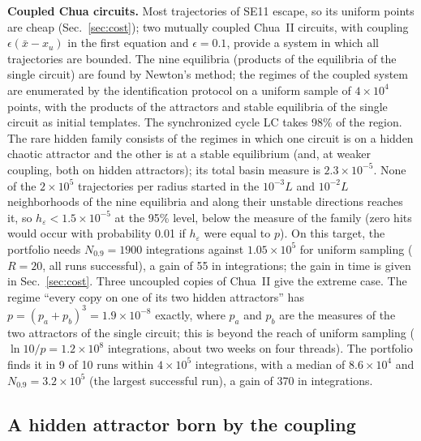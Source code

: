 \textbf{Coupled Chua circuits.} Most trajectories of SE11 escape, so its uniform points are cheap (Sec.~\ref{sec:cost}); two mutually coupled Chua~II circuits, with coupling $\epsilon(\bar x-x_u)$ in the first equation and $\epsilon=0.1$, provide a system in which all trajectories are bounded. The nine equilibria (products of the equilibria of the single circuit) are found by Newton's method; the regimes of the coupled system are enumerated by the identification protocol on a uniform sample of $4\times10^4$ points, with the products of the attractors and stable equilibria of the single circuit as initial templates. The synchronized cycle LC takes 98\% of the region. The rare hidden family consists of the regimes in which one circuit is on a hidden chaotic attractor and the other is at a stable equilibrium (and, at weaker coupling, both on hidden attractors); its total basin measure is $2.3\times10^{-5}$. None of the $2\times10^5$ trajectories per radius started in the $10^{-3}L$ and $10^{-2}L$ neighborhoods of the nine equilibria and along their unstable directions reaches it, so $h_\varepsilon<1.5\times10^{-5}$ at the 95\% level, below the measure of the family (zero hits would occur with probability 0.01 if $h_\varepsilon$ were equal to $p$). On this target, the portfolio needs $N_{0.9}=1900$ integrations against $1.05\times10^5$ for uniform sampling ($R=20$, all runs successful), a gain of 55 in integrations; the gain in time is given in Sec.~\ref{sec:cost}. Three uncoupled copies of Chua~II give the extreme case. The regime ``every copy on one of its two hidden attractors'' has $p=(p_a+p_b)^3=1.9\times10^{-8}$ exactly, where $p_a$ and $p_b$ are the measures of the two attractors of the single circuit; this is beyond the reach of uniform sampling ($\ln10/p=1.2\times10^8$ integrations, about two weeks on four threads). The portfolio finds it in 9 of 10 runs within $4\times10^5$ integrations, with a median of $8.6\times10^4$ and $N_{0.9}=3.2\times10^5$ (the largest successful run), a gain of 370 in integrations.

\subsection{A hidden attractor born by the coupling}\label{sec:newattr}

